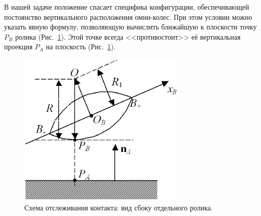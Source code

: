 В нашей задаче положение спасает специфика конфигурации, обеспечивающей 
постоянство вертикального расположения омни-колес. При этом условии можно
указать явную формулу, позволяющую вычислить ближайшую к плоскости точку $P_B$
ролика (Рис.~\ref{ContactScheme}). Этой точке всегда <<противостоит>> её 
вертикальная проекция $P_A$ на плоскость (Рис.~\ref{ContactScheme}).

\begin{figure}[htb]
\centering\includegraphics[width=8cm]{content/parts/3_friction/nd/RollerSection.eps}
\caption{Схема отслеживания контакта: вид сбоку отдельного ролика.}
\label{ContactScheme}
\end{figure}

